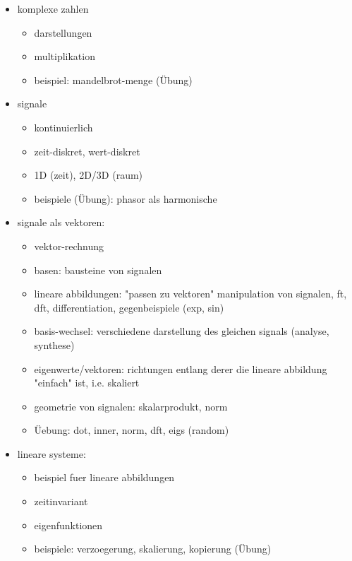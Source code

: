 \begin{itemize}
    \item komplexe zahlen
        \begin{itemize}
            \item darstellungen
            \item multiplikation
            \item beispiel: mandelbrot-menge (\"Ubung)
        \end{itemize}
    \item signale
        \begin{itemize}
            \item kontinuierlich
            \item zeit-diskret, wert-diskret
            \item 1D (zeit), 2D/3D (raum)
            \item beispiele (\"Ubung): phasor als harmonische
        \end{itemize}
    \item signale als vektoren: 
        \begin{itemize}
            \item vektor-rechnung
            \item basen: bausteine von signalen
            \item lineare abbildungen: "passen zu vektoren" manipulation von signalen, \gls{ft}, \gls{dft}, differentiation, gegenbeispiele (exp, sin)
            \item basis-wechsel: verschiedene darstellung des gleichen signals (analyse, synthese)
            \item eigenwerte/vektoren: richtungen entlang derer die lineare abbildung "einfach" ist, i.e. skaliert
            \item geometrie von signalen: skalarprodukt, norm
            \item \"Uebung: dot, inner, norm, dft, eigs (random)
        \end{itemize}
    \item lineare systeme: 
        \begin{itemize}
            \item beispiel fuer lineare abbildungen
            \item zeitinvariant
            \item eigenfunktionen
            \item beispiele: verzoegerung, skalierung, kopierung (\"Ubung)
        \end{itemize}
\end{itemize}